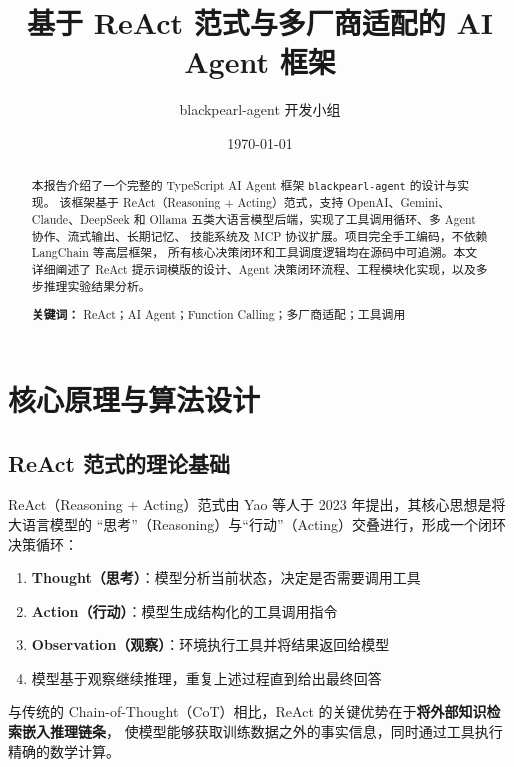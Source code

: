 \documentclass[12pt,a4paper]{ctexart}
\title{\textbf{基于 ReAct 范式与多厂商适配的 AI Agent 框架}}
\author{blackpearl-agent 开发小组}
\date{\today}
\begin{document}
\maketitle

\begin{abstract}
  本报告介绍了一个完整的 TypeScript AI Agent 框架 \texttt{blackpearl-agent} 的设计与实现。
  该框架基于 ReAct（Reasoning + Acting）范式，支持 OpenAI、Gemini、Claude、DeepSeek 和
  Ollama 五类大语言模型后端，实现了工具调用循环、多 Agent 协作、流式输出、长期记忆、
  技能系统及 MCP 协议扩展。项目完全手工编码，不依赖 LangChain 等高层框架，
  所有核心决策闭环和工具调度逻辑均在源码中可追溯。本文详细阐述了 ReAct
  提示词模版的设计、Agent 决策闭环流程、工程模块化实现，以及多步推理实验结果分析。

  \textbf{关键词：} ReAct；AI Agent；Function Calling；多厂商适配；工具调用
\end{abstract}

\newpage
\tableofcontents
\newpage

\section{核心原理与算法设计}

\subsection{ReAct 范式的理论基础}

ReAct（Reasoning + Acting）范式由 Yao 等人于 2023 年提出，其核心思想是将大语言模型的
``思考''（Reasoning）与``行动''（Acting）交叠进行，形成一个闭环决策循环：

\begin{enumerate}[label=(\arabic*)]
  \item \textbf{Thought（思考）}：模型分析当前状态，决定是否需要调用工具
  \item \textbf{Action（行动）}：模型生成结构化的工具调用指令
  \item \textbf{Observation（观察）}：环境执行工具并将结果返回给模型
  \item 模型基于观察继续推理，重复上述过程直到给出最终回答
\end{enumerate}

与传统的 Chain-of-Thought（CoT）相比，ReAct 的关键优势在于\textbf{将外部知识检索嵌入推理链条}，
使模型能够获取训练数据之外的事实信息，同时通过工具执行精确的数学计算。
\end{document}
